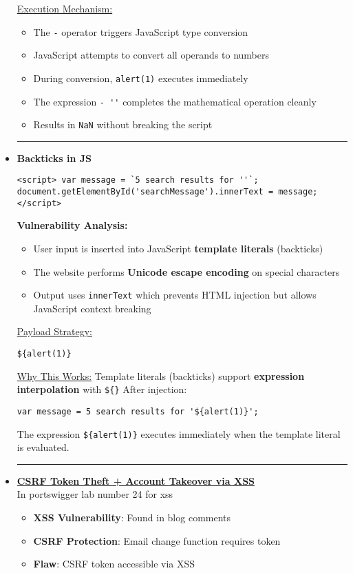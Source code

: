\documentclass{article}
\begin{document}
\begin{itemize}
\underline{Execution Mechanism:}
\begin{itemize}
\item The \verb|-| operator triggers JavaScript type conversion
\item JavaScript attempts to convert all operands to numbers
\item During conversion, \verb|alert(1)| executes immediately
\item The expression \verb|- ''| completes the mathematical operation cleanly
\item Results in \verb|NaN| without breaking the script
\end{itemize}
\rule{5cm}{0.4pt}
\item \textbf{Backticks in JS}
\begin{lstlisting}[frame=single]
<script> var message = `5 search results for ''`;
document.getElementById('searchMessage').innerText = message; </script>
\end{lstlisting}
\textbf{Vulnerability Analysis:}
\begin{itemize}
\item User input is inserted into JavaScript \textbf{template literals} (backticks)
\item The website performs \textbf{Unicode escape encoding} on special characters
\item Output uses \texttt{innerText} which prevents HTML injection but allows JavaScript context breaking
\end{itemize}

\underline{Payload Strategy:}
\begin{lstlisting}[frame=single]
${alert(1)}
\end{lstlisting}

\underline{Why This Works:}
Template literals (backticks) support \textbf{expression interpolation} with \verb|${}|
After injection:
\begin{lstlisting}[frame=single]
var message = 5 search results for '${alert(1)}';
\end{lstlisting}
The expression \verb|${alert(1)}| executes immediately when the template literal is evaluated.

\rule{5cm}{0.4pt}
\item \textbf{\underline{ CSRF Token Theft + Account Takeover via XSS}}     
\\In portswigger lab number 24 for xss
\begin{itemize}
\item \textbf{XSS Vulnerability}: Found in blog comments
\item \textbf{CSRF Protection}: Email change function requires token
\item \textbf{Flaw}: CSRF token accessible via XSS
\end{itemize}


\end{itemize}
\end{document}
